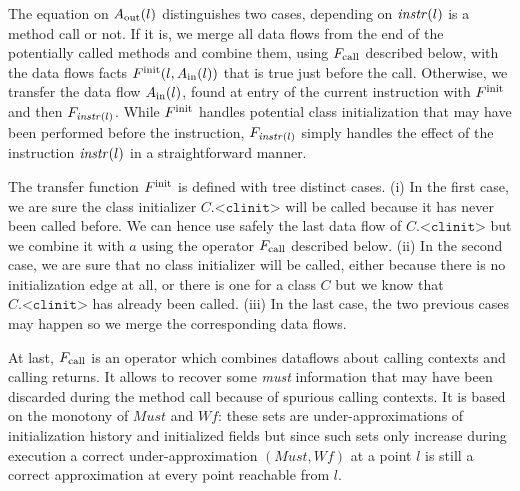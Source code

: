 \documentclass{entcs}
\newcommand{\clinit}{\ensuremath{\texttt{<clinit>}}}
\newcommand{\must}{\ensuremath{\mathit{Must}}}
\newcommand{\wf}{\ensuremath{\mathit{Wf}}}
\begin{document}
The equation on $A_{\mathrm{out}}(l)$ distinguishes two cases, depending on
$\mathit{instr}(l)$ is a method call or not.  If it is, we merge all data
flows from the end of the potentially called methods and combine them,
using $F_{\mathrm{call}}$ described below, with the data flows facts
$F^{\mathrm{init}}(l,A_{\mathrm{in}}(l))$ that is true just before the call.  Otherwise,
we transfer the data flow $A_{\mathrm{in}}(l)$, found at entry of the current
instruction with $F^{\mathrm{init}}$ and then $F_{\mathit{instr}(l)}$.  While $F^{\mathrm{init}}$
handles potential class initialization that may have been performed
before the instruction, $F_{\mathit{instr}(l)}$ simply handles the effect of
the instruction $\mathit{instr}(l)$ in a straightforward manner.

The transfer function $F^{\mathrm{init}}$ is defined with tree distinct cases.
(i) In the first case, we are sure the class initializer $C.\clinit$
will be called because it has never been called before.  We can hence
use safely the last data flow of $C.\clinit$ but we combine it with
$a$ using the operator $F_{\mathrm{call}}$ described below.
(ii) In the second case, we are sure that no class initializer will be
called, either because there is no initialization edge at all, or
there is one for a class $C$ but we know that $C.\clinit$ has already
been called.
(iii) In the last case, the two previous cases may happen so we merge
the corresponding data flows.

At last, $F_{\mathrm{call}}$ is an operator which combines dataflows about
calling contexts and calling
returns. It allows to recover some \emph{must} information that may have been
discarded during the method call because of spurious calling
contexts.  It is based on the monotony of $\must$ and $\wf$: these sets
are under-approximations of initialization history and initialized
fields but since such sets only increase during execution a correct
under-approximation $(\must,\wf)$ at a point $l$ is still a correct
approximation at every point reachable from $l$.
\end{document}
